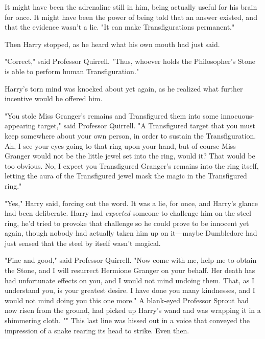 It might have been the adrenaline still in him, being actually useful for his 
brain for once. It might have been the power of being told that an answer 
existed, and that the evidence wasn't a lie. "It can make Transfigurations 
permanent."

Then Harry stopped, as he heard what his own mouth had just said.

"Correct," said Professor Quirrell. "Thus, whoever holds the Philosopher's 
Stone is able to perform human Transfiguration."

Harry's torn mind was knocked about yet again, as he realized what further 
incentive would be offered him.

"You stole Miss Granger's remains and Transfigured them into some 
innocuous-appearing target," said Professor Quirrell. "A Transfigured target 
that you must keep somewhere about your own person, in order to sustain the 
Transfiguration. Ah, I see your eyes going to that ring upon your hand, but of 
course Miss Granger would not be the little jewel set into the ring, would it? 
That would be too obvious. No, I expect you Transfigured Granger's remains into 
the ring itself, letting the aura of the Transfigured jewel mask the magic in 
the Transfigured ring."

"Yes," Harry said, forcing out the word. It was a lie, for once, and Harry's 
glance had been deliberate. Harry had \emph{expected} someone to challenge him 
on the steel ring, he'd tried to provoke that challenge so he could prove to be 
innocent yet again, though nobody had actually taken him up on it---maybe 
Dumbledore had just sensed that the steel by itself wasn't magical.

"Fine and good," said Professor Quirrell. "Now come with me, help me to obtain 
the Stone, and I will resurrect Hermione Granger on your behalf. Her death has 
had unfortunate effects on you, and I would not mind undoing them. That, as I 
understand you, is your greatest desire. I have done you many kindnesses, and I 
would not mind doing you this one more." A blank-eyed Professor Sprout had now 
risen from the ground, had picked up Harry's wand and was wrapping it in a 
shimmering cloth. "" This last line was hissed out in a 
voice that conveyed the impression of a snake rearing its head to strike.
\sbreak
Even then.

